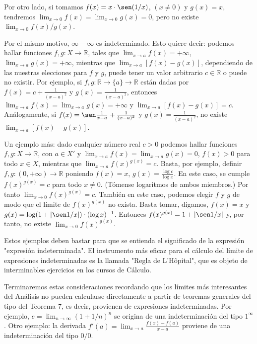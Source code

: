 \documentclass[12pt,oneside]{book}
\begin{document}
Por otro lado, si tomamos \( f(x) = x \cdot \sen(1/x) \), \( (x \neq 0) \) y \( g(x) = x \), tendremos \( \lim_{x \to 0} f(x) = \lim_{x \to 0} g(x) = 0 \), pero no existe \( \lim_{x \to 0} f(x)/g(x) \).

Por el mismo motivo, \( \infty - \infty \) es indeterminado. Esto quiere decir: podemos hallar funciones \( f, g: X \to \mathbb{R} \), tales que \( \lim_{x \to a} f(x) = +\infty \), \( \lim_{x \to a} g(x) = +\infty \), mientras que \( \lim_{x \to a} [f(x) - g(x)] \), dependiendo de las nuestras elecciones para \( f \) y \( g \), puede tener un valor arbitrario \( c \in \mathbb{R} \) o puede no existir. Por ejemplo, si \( f, g: \mathbb{R} \to \{a\} \to \mathbb{R} \) están dadas por \( f(x) = c + \frac{1}{(x - a)^2} \) y \( g(x) = \frac{1}{(x - a)^2} \), entonces \( \lim_{x \to a} f(x) = \lim_{x \to a} g(x) = +\infty \) y \( \lim_{x \to a} [f(x) - g(x)] = c \). Análogamente, si \( f(x) = \sen \frac{1}{x - a} + \frac{1}{(x - a)^2} \) y \( g(x) = \frac{1}{(x - a)^2} \), no existe \( \lim_{x \to a} [f(x) - g(x)] \).

Un ejemplo más: dado cualquier número real \( c > 0 \) podemos hallar funciones \( f, g: X \to \mathbb{R} \), con \( a \in X' \) y \( \lim_{x \to a} f(x) = \lim_{x \to a} g(x) = 0 \), \( f(x) > 0 \) para todo \( x \in X \), mientras que \( \lim_{x \to a} f(x)^{g(x)} = c \). Basta, por ejemplo, definir \( f, g: (0, +\infty) \to \mathbb{R} \) poniendo \( f(x) = x \), \( g(x) = \frac{\log c}{\log x} \). En este caso, se cumple \( f(x)^{g(x)} = c \) para todo \( x \neq 0 \). (Tómense logaritmos de ambos miembros.) Por tanto \( \lim_{x \to 0} f(x)^{g(x)} = c \). También en este caso, podemos elegir \( f \) y \( g \) de modo que el límite de \( f(x)^{g(x)} \) no exista. Basta tomar, digamos, \( f(x) = x \) y \( g(x) = \log(1 + |\sen 1/x|) \cdot (\log x)^{-1} \). Entonces \( f(x)^{g(x)} = 1 + |\sen 1/x| \) y, por tanto, no existe \( \lim_{x \to 0} f(x)^{g(x)} \).

Estos ejemplos deben bastar para que se entienda el significado de la expresión "expresión indeterminada". El instrumento más eficaz para el cálculo del límite de expresiones indeterminadas es la llamada "Regla de L'Hôpital", que es objeto de interminables ejercicios en los cursos de Cálculo.

Terminaremos estas consideraciones recordando que los límites más interesantes del Análisis no pueden calcularse directamente a partir de teoremas generales del tipo del Teorema 7, es decir, provienen de expresiones indeterminadas. Por ejemplo, \( e = \lim_{n \to \infty} (1 + 1/n)^n \) se origina de una indeterminación del tipo \( 1^\infty \). Otro ejemplo: la derivada \( f'(a) = \lim_{x \to a} \frac{f(x) - f(a)}{x - a} \) proviene de una indeterminación del tipo \( 0/0 \).
\end{document}
